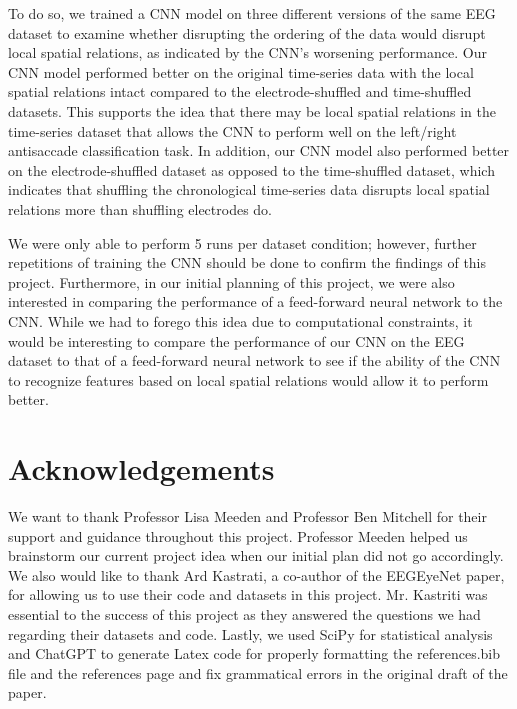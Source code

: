 \documentclass[11pt]{article}
\begin{document}
To do so, we trained a CNN model on three different versions of the same EEG dataset to examine whether disrupting the ordering of the data would disrupt local spatial relations, as indicated by the CNN's worsening performance. Our CNN model performed better on the original time-series data with the local spatial relations intact compared to the electrode-shuffled and time-shuffled datasets. This supports the idea that there may be local spatial relations in the time-series dataset that allows the CNN to perform well on the left/right antisaccade classification task. In addition, our CNN model also performed better on the electrode-shuffled dataset as opposed to the time-shuffled dataset, which indicates that shuffling the chronological time-series data disrupts local spatial relations more than shuffling electrodes do.

We were only able to perform 5 runs per dataset condition; however, further repetitions of training the CNN should be done to confirm the findings of this project. Furthermore, in our initial planning of this project, we were also interested in comparing the performance of a feed-forward neural network to the CNN. While we had to forego this idea due to computational constraints, it would be interesting to compare the performance of our CNN on the EEG dataset to that of a feed-forward neural network to see if the ability of the CNN to recognize features based on local spatial relations would allow it to perform better.

\section{Acknowledgements}



We want to thank Professor Lisa Meeden and Professor Ben Mitchell for their support and guidance throughout this project. Professor Meeden helped us brainstorm our current project idea when our initial plan did not go accordingly. We also would like to thank Ard Kastrati, a co-author of the EEGEyeNet paper, for allowing us to use their code and datasets in this project. Mr. Kastriti was essential to the success of this project as they answered the questions we had regarding their datasets and code. Lastly, we used SciPy for statistical analysis and ChatGPT to generate Latex code for properly formatting the references.bib file and the references page and fix grammatical errors in the original draft of the paper.

\pagebreak
\printbibliography
\end{document}
